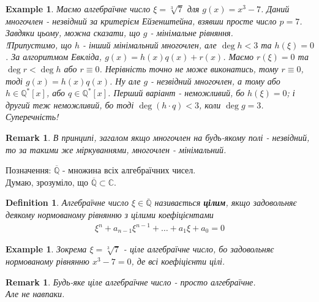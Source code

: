 \documentclass[a4paper, 10pt]{article}
\theoremstyle{theoremdd}
\theoremstyle{theoremdd}
\newtheorem{definition}[theorem]{Definition}
\theoremstyle{theoremdd}
\theoremstyle{theoremdd}
\newtheorem{example}[theorem]{Example}
\theoremstyle{theoremdd}
\theoremstyle{theoremdd}
\newtheorem{remark}[theorem]{Remark}
\theoremstyle{theoremdd}
\theoremstyle{theoremdd}
\begin{document}
\begin{example}
Маємо алгебраїчне число $\xi = \sqrt[3]{7}$ для $g(x) = x^3 - 7$. Даний многочлен - незвідний за критерієм Ейзенштейна, взявши просте число $p = 7$. Завдяки цьому, можна сказати, що $g$ - мінімальне рівняння.\\
!Припустимо, що $h$ - інший мінімальний многочлен, але $\deg h < 3$ та $h(\xi) = 0$. За алгоритмом Евкліда, $g(x) = h(x)q(x) + r(x)$. Маємо $r(\xi) = 0$ та $\deg r < \deg h$ або $r \equiv 0$. Нерівність точно не може виконатись, тому $r \equiv 0$, тоді $g(x) = h(x)q(x)$.  Ну але $g$ - незвідний многочлен, а тому або $h \in \mathbb{Q}^*[x]$, або $q \in \mathbb{Q}^*[x]$. Перший варіант - неможливий, бо $h(\xi) = 0$; і другий теж неможливий, бо тоді $\deg (h \cdot q) < 3$, коли $\deg g = 3$. Суперечність!
\end{example}

\begin{remark}
В принципі, загалом якщо многочлен на будь-якому полі - незвідний, то за такими же міркуваннями, многочлен - мінімальний.
\end{remark}

Позначення: $\overline{\mathbb{Q}}$ - множина всіх алгебраїчних чисел.\\
Думаю, зрозуміло, що $\overline{\mathbb{Q}} \subset \mathbb{C}$.

\begin{definition}
Алгебраїчне число $\xi \in \overline{\mathbb{Q}}$ називається \textbf{цілим}, якщо задовольняє деякому нормованому рівнянню з цілими коефіцієнтами
\begin{align*}
\xi^n + a_{n-1}\xi^{n-1} + \dots + a_1 \xi + a_0 = 0
\end{align*}
\end{definition}

\begin{example}
Зокрема $\xi = \sqrt[3]{7}$ - ціле алгебраїчне число, бо задовольняє нормованому рівнянню $x^3 - 7 = 0$, де всі коефіцієнти цілі.
\end{example}

\begin{remark}
Будь-яке ціле алгебраїчне число - просто алгебраїчне.\\
Але не навпаки.
\end{remark}
\end{document}
